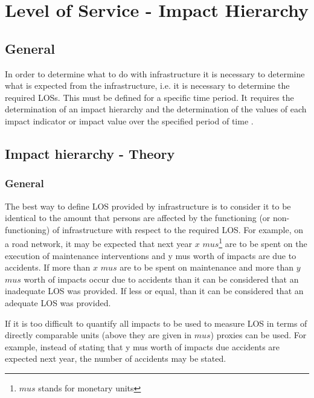 %
%
%
\chapter{Level of Service - Impact Hierarchy}
\label{2:los} %
\section{General}
In order to determine what to do with infrastructure it is necessary to determine what is expected from the infrastructure, i.e. it is necessary to determine the required LOSs. This must be defined for a specific time period. It requires the determination of an impact hierarchy and the determination of the values of each impact indicator or impact value over the specified period of time \citep{Adey2012}.
\section{Impact hierarchy - Theory}
\subsection{General}
The best way to define LOS provided by infrastructure is to consider it to be identical to the amount that persons are affected by the functioning (or non-functioning) of infrastructure with respect to the required LOS. For example, on a road network, it may be expected that next year $x$ $mus$\footnote{$mus$ stands for monetary units} are to be spent on the execution of maintenance interventions and y mus worth of impacts are due to accidents. If more than $x$ $mus$ are to be spent on maintenance and more than $y$ $mus$ worth of impacts occur due to accidents than it can be considered that an inadequate LOS was provided. If less or equal, than it can be considered that an adequate LOS was provided.

If it is too difficult to quantify all impacts to be used to measure LOS in terms of directly comparable units (above they are given in $mus$) proxies can be used. For example, instead of stating that y mus worth of impacts due accidents are expected next year, the number of accidents may be stated. 


